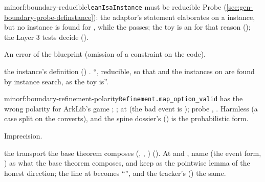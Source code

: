 \begin{finding}{minor}{f:boundary-reducible}{\texttt{leanIsaInstance} must be reducible}
 Probe  (\cref{sec:gen-boundary-probe-definstance}): the
adaptor's statement elaborates on a  instance, but no  instance is found
for , while the  passes; the toy is an  for
that reason (); the Layer 3 tests decide 
().

 An error of the blueprint (omission of a constraint on the code).

\begin{change}{the instance's definition ()}
\asis {}.
\asproposed \enquote{, reducible, so that
 and the instances on  are
found by instance search, as the toy is}.
\end{change}
\end{finding}

\begin{finding}{minor}{f:boundary-refinement-polarity}{\texttt{Refinement.map\_option\_valid} has the wrong polarity for ArkLib's game}
 ; ;
 at  (the bad event is
); probe , . Harmless (a case split
on the  converts), and the spine dossier's 
() is the probabilistic form.

 Imprecision.

\begin{change}{the transport the base theorem composes (, , )}
\asis {}
().
\asproposed At  and , name 
(the event form, ) as what the base theorem composes, and keep
 as the pointwise lemma of the honest direction; the line at 
becomes
\enquote{},
and the tracker's  () the same.
\end{change}
\end{finding}

